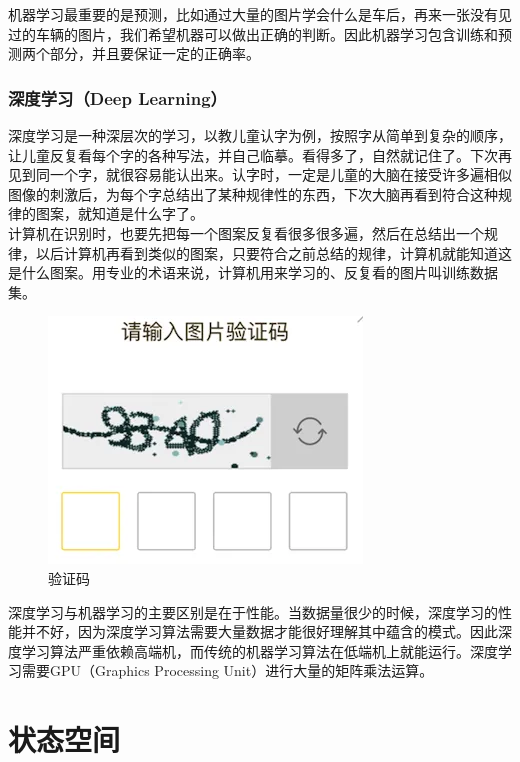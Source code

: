 机器学习最重要的是预测，比如通过大量的图片学会什么是车后，再来一张没有见过的车辆的图片，我们希望机器可以做出正确的判断。因此机器学习包含训练和预测两个部分，并且要保证一定的正确率。\\

\subsubsection{深度学习（Deep Learning）}

深度学习是一种深层次的学习，以教儿童认字为例，按照字从简单到复杂的顺序，让儿童反复看每个字的各种写法，并自己临摹。看得多了，自然就记住了。下次再见到同一个字，就很容易能认出来。认字时，一定是儿童的大脑在接受许多遍相似图像的刺激后，为每个字总结出了某种规律性的东西，下次大脑再看到符合这种规律的图案，就知道是什么字了。\\

计算机在识别时，也要先把每一个图案反复看很多很多遍，然后在总结出一个规律，以后计算机再看到类似的图案，只要符合之前总结的规律，计算机就能知道这是什么图案。用专业的术语来说，计算机用来学习的、反复看的图片叫训练数据集。

\begin{figure}[H]
    \centering
    \includegraphics{img/C1/1-1/2.png}
    \caption{验证码}
\end{figure}

深度学习与机器学习的主要区别是在于性能。当数据量很少的时候，深度学习的性能并不好，因为深度学习算法需要大量数据才能很好理解其中蕴含的模式。因此深度学习算法严重依赖高端机，而传统的机器学习算法在低端机上就能运行。深度学习需要GPU（Graphics Processing Unit）进行大量的矩阵乘法运算。

\newpage

\section{状态空间}


